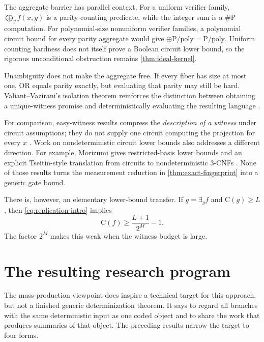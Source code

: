 \documentclass[11pt]{article}
\theoremstyle{definition}
\theoremstyle{remark}
\newcommand{\C}{\mathrm C}
\begin{document}
The aggregate barrier has parallel context.  For a uniform verifier family,
$\bigoplus_yf(x,y)$ is a parity-counting predicate, while the integer sum is a
$\#\mathrm P$ computation.  For polynomial-size nonuniform verifier families,
a polynomial circuit bound for every parity aggregate would give
$\mathord\oplus\mathrm{P/poly}=\mathrm{P/poly}$.  Uniform counting hardness
does not itself prove a Boolean circuit lower bound, so the rigorous
unconditional obstruction remains \cref{thm:ideal-kernel}.

Unambiguity does not make the aggregate free.  If every fiber has size at
most one, OR equals parity exactly, but evaluating that parity may still be
hard.  Valiant--Vazirani's isolation theorem reinforces the distinction
between obtaining a unique-witness promise and deterministically evaluating
the resulting language \cite{ValiantVazirani1986}.

For comparison, easy-witness results compress the \emph{description of a
witness} under circuit assumptions; they do not supply one circuit computing
the projection for every $x$ \cite{MurrayWilliams2020}.  Work on
nondeterministic circuit lower bounds also addresses a different direction.
For example, Morizumi gives restricted-basis lower bounds and an explicit
Tseitin-style translation from circuits to nondeterministic 3-CNFs
\cite{Morizumi2015}.  None of those results turns the measurement reduction
in \cref{thm:exact-fingerprint} into a generic gate bound.

There is, however, an elementary lower-bound transfer.  If $g=\exists_yf$ and
$\C(g)\ge L$, then \eqref{eq:replication-intro} implies
\[
  \C(f)\ge\frac{L+1}{2^M}-1.
  \tag{8.4}\label{eq:lower-transfer}
\]
The factor $2^M$ makes this weak when the witness budget is large.

\section{The resulting research program}
\label{sec:open}

The mass-production viewpoint does inspire a technical target for this
approach, but not a finished generic determinization theorem.  It says to
regard all branches with the same deterministic input as one coded object and
to share the work that produces summaries of that object.  The preceding
results narrow the target to four forms.
\end{document}
